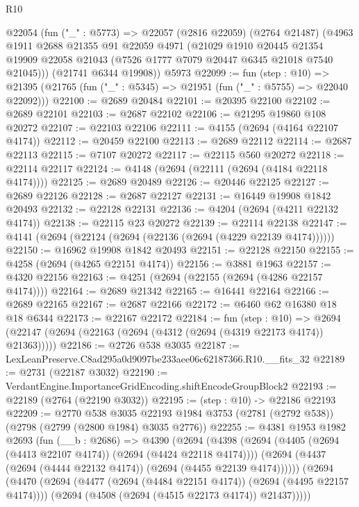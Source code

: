 \begin{lexlean}{R10}
\begin{coremodule}
  @22054
    (fun ("_" : @5773) =>
    @22057
      (@2816 @22059)
      (@2764 @21487)
      (@4963
        @1911
        @2688
        @21355
        @91
        @22059
        @4971
        (@21029
          @1910
          @20445
          @21354
          @19909
          @22058
          @21043
          (@7526 @1777 @7079 @20447 @6345 @21018 @7540 @21045)))
      (@21741 @6344 @19908))
    @5973
@22099 := fun (step : @10) =>
  @21395 (@21765 (fun ("_" : @5345) => @21951 (fun ("_" : @5755) => @22040 @22092)))
@22100 := @2689 @20484
@22101 := @20395 @22100
@22102 := @2689 @22101
@22103 := @2687 @22102
@22106 := @21295 @19860 @108 @20272
@22107 := @22103 @22106
@22111 := @4155 (@2694 (@4164 @22107 @4174))
@22112 := @20459 @22100
@22113 := @2689 @22112
@22114 := @2687 @22113
@22115 := @7107 @20272
@22117 := @22115 @560 @20272
@22118 := @22114 @22117
@22124 := @4148 (@2694 (@22111 (@2694 (@4184 @22118 @4174))))
@22125 := @2689 @20489
@22126 := @20446 @22125
@22127 := @2689 @22126
@22128 := @2687 @22127
@22131 := @16449 @19908 @1842 @20493
@22132 := @22128 @22131
@22136 := @4204 (@2694 (@4211 @22132 @4174))
@22138 := @22115 @23 @20272
@22139 := @22114 @22138
@22147 := @4141 (@2694 (@22124 (@2694 (@22136 (@2694 (@4229 @22139 @4174))))))
@22150 := @16962 @19908 @1842 @20493
@22151 := @22128 @22150
@22155 := @4258 (@2694 (@4265 @22151 @4174))
@22156 := @3881 @1963
@22157 := @4320 @22156
@22163 := @4251 (@2694 (@22155 (@2694 (@4286 @22157 @4174))))
@22164 := @2689 @21342
@22165 := @16441 @22164
@22166 := @2689 @22165
@22167 := @2687 @22166
@22172 := @6460 @62 @16380 @18 @18 @6344
@22173 := @22167 @22172
@22184 := fun (step : @10) =>
  @2694 (@22147 (@2694 (@22163 (@2694 (@4312 (@2694 (@4319 @22173 @4174)) @21363)))))
@22186 := @2726 @538 @3035
@22187 := LexLeanPreserve.C8ad295a0d9097be233aee06c62187366.R10.__fits_32
@22189 := @2731 (@22187 @3032)
@22190 := VerdantEngine.ImportanceGridEncoding.shiftEncodeGroupBlock2
@22193 := @22189 (@2764 (@22190 @3032))
@22195 := (step : @10) -> @22186 @22193
@22209 := @2770
    @538
    @3035
    @22193
    @1984
    @3753
    (@2781 (@2792 @538))
    (@2798 (@2799 (@2800 @1984) @3035 @2776))
@22255 := @4381
    @1953
    @1982
    @2693
    (fun (__b : @2686) =>
    @4390
      (@2694
        (@4398
          (@2694 (@4405 (@2694 (@4413 @22107 @4174)) (@2694 (@4424 @22118 @4174))))
          (@2694 (@4437 (@2694 (@4444 @22132 @4174)) (@2694 (@4455 @22139 @4174))))))
      (@2694
        (@4470
          (@2694 (@4477 (@2694 (@4484 @22151 @4174)) (@2694 (@4495 @22157 @4174))))
          (@2694 (@4508 (@2694 (@4515 @22173 @4174)) @21437)))))

\end{coremodule}
\end{lexlean}
